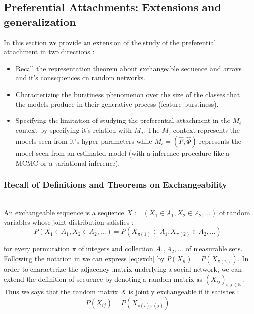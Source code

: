 
\subsection{Preferential Attachments: Extensions and generalization}

In this section we provide an extension of the study of the preferential attachment in two directions :
\begin{itemize}
    \item Recall the representation theorem \cite{orbanz2015bayesian} about exchangeable sequence and arrays and it's consequences on random networks.%
    \item Characterizing the burstiness phenomenon over the size of the classes that the models produce in their generative process (feature burstiness). 
    \item Specifying the limitation of studying the preferential attachment in the $M_e$ context by specifying it's relation with $M_g$. The $M_g$ context represents the models seen from it's hyper-parameters while $M_e = (\hat F, \hat \Phi)$ represents the model seen from an estimated model (with a inference procedure like a MCMC or a variational inference).
\end{itemize}

\subsubsection{Recall of Definitions and Theorems on Exchangeability}~\\

An exchangeable sequence is a sequence $X := (X_1 \in A_1, X_2 \in A_2,...)$ of random variables whose joint distribution satisfies :
\begin{equation}\label{eq:exch}
P(X_1 \in A_1, X_2 \in A_2,...) = P(X_{\pi(1)} \in A_1, X_{\pi(2)} \in A_2,...)
\end{equation}

for every permutation $\pi$  of integers and collection $A_1, A_2,...$ of measurable sets. Following the notation in \cite{orbanz2015bayesian} we can express \eqref{eq:exch} by $P(X_n) = P(X_{\pi(n)})$. In order to characterize the adjacency matrix underlying a social network, we can extend the definition of sequence by denoting a random matrix as $(X_{ij})_{i,j \in \mathbb{N}}$. Thus we says that the random matrix $X$ is jointly exchangeable if it satisfies :
	\begin{equation}
	P(X_{ij}) = P(X_{\pi(i)\pi(j)})
	\end{equation}
	
